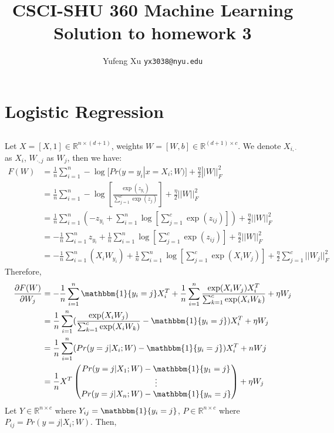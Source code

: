 \documentclass{article}
\title{CSCI-SHU 360 Machine Learning\\
    Solution to homework 3}
\author{Yufeng Xu \texttt{yx3038@nyu.edu}}
\begin{document}
    \maketitle

    \section{Logistic Regression}

        \subsection{}
        Let $X=[X,1]\in\mathbb{R}^{n\times (d+1)}$, weights $W=[W,b]\in\mathbb{R}^{(d+1)\times c}$. 
        We denote $X_{i,\cdot}$ as $X_i$, $W_{\cdot, j}$ as $W_j$, then we have:
        \begin{align*}
            F(W)&=\frac{1}{n}\sum_{i=1}^{n}-\log[Pr(y=y_i|x=X_i;W)]+\frac{\eta}{2}||W||_{F}^{2}\\
            &=\frac{1}{n}\sum_{i=1}^{n}-\log[\frac{\exp(z_{y_i})}{\sum_{j=1}^{c}\exp(z_j)}]+\frac{\eta}{2}||W||_{F}^{2}\\
            &=\frac{1}{n}\sum_{i=1}^{n}(-z_{y_i}+\sum_{i=1}^{n}\log[\sum_{j=1}^{c}\exp(z_{ij})])+\frac{\eta}{2}||W||_{F}^{2}\\
            &=-\frac{1}{n}\sum_{i=1}^{n}z_{y_i}+\frac{1}{n}\sum_{i=1}^{n}\log[\sum_{j=1}^{c}\exp(z_{ij})]+\frac{\eta}{2}||W||_{F}^{2}\\
            &=-\frac{1}{n}\sum_{i=1}^{n}(X_i W_{y_i})+\frac{1}{n}\sum_{i=1}^{n}\log[\sum_{j=1}^{c}\exp(X_i W_j)]+\frac{\eta}{2}\sum_{j=1}^{c}||W_j||_{F}^{2}
        \end{align*}
        Therefore, 
        \begin{align*}
            \frac{\partial F(W)}{\partial W_{j}}
            &=-\frac{1}{n}\sum_{i=1}^{n}\mathbbm{1}\{y_i=j\}X_i^T
            +\frac{1}{n}\sum_{i=1}^{n}\frac{\exp(X_i W_j)X_i^T}{\sum_{k=1}^{c}\exp(X_iW_k)}+\eta W_j\\
            &=\frac{1}{n}\sum_{i=1}^n(\frac{\exp(X_i W_j)}{\sum_{k=1}^{c}\exp(X_iW_k)}-\mathbbm{1}\{y_i=j\})X_i^T+\eta W_j\\
            &=\frac{1}{n}\sum_{i=1}^n(Pr(y=j|X_i;W)-\mathbbm{1}\{y_i=j\})X_i^T+nWj\\
            &=\frac{1}{n}X^T\begin{pmatrix}
                Pr(y=j|X_1;W)-\mathbbm{1}\{y_1=j\}\\\vdots\\Pr(y=j|X_n;W)-\mathbbm{1}\{y_n=j\}
            \end{pmatrix}+\eta W_j
        \end{align*}
        Let $Y\in\mathbb{R}^{n\times c}$ where $Y_{ij}=\mathbbm{1}\{y_i=j\}$, 
        $P\in\mathbb{R}^{n\times c}$ where $P_{ij}=Pr(y=j|X_i;W)$. 
        Then,\\
\end{document}
